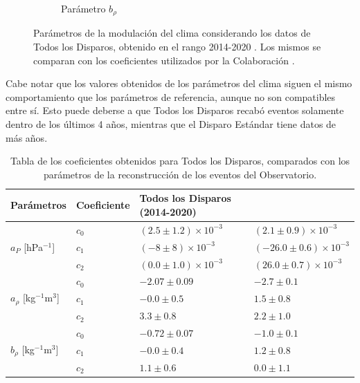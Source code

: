 \begin{figure}[H]
\begin{subfigure}[b]{\textwidth}
  \caption{Parámetro  $b_\rho$   }
  \end{subfigure}
  \caption{Parámetros de la modulación del clima considerando los datos de Todos los Disparos, obtenido en el rango 2014-2020 . Los mismos se comparan con los coeficientes utilizados por la Colaboración \cite{aab2017impact}.}
  \label{fig:ALL-params}
\end{figure}

Cabe notar que los valores obtenidos de los parámetros del clima siguen el mismo comportamiento que los parámetros de referencia, aunque no son compatibles entre sí. Esto puede deberse a que Todos los Disparos recabó eventos solamente dentro de los últimos 4 años, mientras que el Disparo Estándar tiene datos de más años.

\begin{table}[H]
  \centering
  \begin{tabular}{l|l|l|l}
       Parámetros									& Coeficiente		& Todos los Disparos (2014-2020)	                  & \cite{aab2017impact}	\\ \hline \hline
   \multirow{3}{*}{$a_P$ [hPa$^{-1}$]}  			    &  $c_0$			& $( 2.5\pm 1.2)\times 10^{-3}$	& $( 2.1 \pm 0.9)\times 10^{-3} $	\\ \cline{2-4} %
                                                  &  $c_1$			& $(-8 \pm 8)\times 10^{-3}$	& $(-26.0 \pm 0.6 )\times 10^{-3}$	\\ \cline{2-4} 
                                                  &  $c_2$			& $( 0.0\pm 1.0)\times 10^{-3}$	& $( 26.0 \pm 0.7 )\times 10^{-3}$	\\ \hline \hline%
  
   \multirow{3}{*}{$a_\rho$ [kg$^{-1}$m$^3$]}  	  &  $c_0$			& $-2.07   \pm 0.09$	            & $ -2.7  \pm 0.1  $\\ \cline{2-4} 
                                                  &  $c_1$			& $-0.0    \pm 0.5 $	            & $ 1.5   \pm 0.8  $\\ \cline{2-4} 
                                                  &  $c_2$			& $ 3.3    \pm 0.8 $	            & $ 2.2   \pm 1.0  $\\ \hline \hline%
  
  \multirow{3}{*}{$b_\rho$ [kg$^{-1}$m$^3$]} 		  &  $c_0$			& $-0.72   \pm 0.07$		            & $-1.0   \pm 0.1 $	\\ \cline{2-4} 
                                                  &  $c_1$			& $-0.0    \pm 0.4$		            & $ 1.2   \pm 0.8  $	\\ \cline{2-4} 
                                                  &  $c_2$			& $ 1.1    \pm 0.6$		            & $ 0.0   \pm 1.1  $	\\ 
  
  \end{tabular}	
  \caption{Tabla de los coeficientes obtenidos para Todos los Disparos, comparados con los parámetros de la reconstrucción de los eventos del Observatorio.} \label{tabla:cuadratica_ALL}
\end{table}


